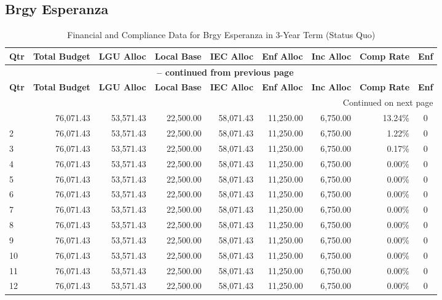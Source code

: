 \subsection{Brgy Esperanza}
\begin{longtable}{lrrrrrrrc}
\caption{Financial and Compliance Data for Brgy Esperanza in 3-Year Term (Status Quo)} \\
\toprule
\textbf{Qtr} & \textbf{Total Budget} & \textbf{LGU Alloc} & \textbf{Local Base} & \textbf{IEC Alloc} & \textbf{Enf Alloc} & \textbf{Inc Alloc} & \textbf{Comp Rate} & \textbf{Enf} \\
\midrule
\endfirsthead
\multicolumn{9}{c}{{\bfseries \tablename\ \thetable{} -- continued from previous page}} \\
\toprule
\textbf{Qtr} & \textbf{Total Budget} & \textbf{LGU Alloc} & \textbf{Local Base} & \textbf{IEC Alloc} & \textbf{Enf Alloc} & \textbf{Inc Alloc} & \textbf{Comp Rate} & \textbf{Enf} \\
\midrule
\endhead
\hline \multicolumn{9}{r}{{Continued on next page}} \\ \hline
\endfoot
\bottomrule
\endlastfoot
1 & 76,071.43 & 53,571.43 & 22,500.00 & 58,071.43 & 11,250.00 & 6,750.00 & 13.24\% & 0 \\
2 & 76,071.43 & 53,571.43 & 22,500.00 & 58,071.43 & 11,250.00 & 6,750.00 & 1.22\% & 0 \\
3 & 76,071.43 & 53,571.43 & 22,500.00 & 58,071.43 & 11,250.00 & 6,750.00 & 0.17\% & 0 \\
4 & 76,071.43 & 53,571.43 & 22,500.00 & 58,071.43 & 11,250.00 & 6,750.00 & 0.00\% & 0 \\
5 & 76,071.43 & 53,571.43 & 22,500.00 & 58,071.43 & 11,250.00 & 6,750.00 & 0.00\% & 0 \\
6 & 76,071.43 & 53,571.43 & 22,500.00 & 58,071.43 & 11,250.00 & 6,750.00 & 0.00\% & 0 \\
7 & 76,071.43 & 53,571.43 & 22,500.00 & 58,071.43 & 11,250.00 & 6,750.00 & 0.00\% & 0 \\
8 & 76,071.43 & 53,571.43 & 22,500.00 & 58,071.43 & 11,250.00 & 6,750.00 & 0.00\% & 0 \\
9 & 76,071.43 & 53,571.43 & 22,500.00 & 58,071.43 & 11,250.00 & 6,750.00 & 0.00\% & 0 \\
10 & 76,071.43 & 53,571.43 & 22,500.00 & 58,071.43 & 11,250.00 & 6,750.00 & 0.00\% & 0 \\
11 & 76,071.43 & 53,571.43 & 22,500.00 & 58,071.43 & 11,250.00 & 6,750.00 & 0.00\% & 0 \\
12 & 76,071.43 & 53,571.43 & 22,500.00 & 58,071.43 & 11,250.00 & 6,750.00 & 0.00\% & 0 \\
\end{longtable}
\clearpage

